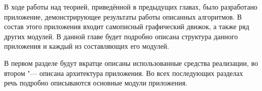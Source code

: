 В ходе работы над теорией, приведённой в предыдущих главах, было разработано приложение, демонстрирующее результаты
работы описанных алгоритмов. В состав этого приложения входит самописный графический движок, а также ряд других модулей.
В данной главе будет подробно описана структура данного приложения и каждый из составляющих его модулей.

В первом разделе будут вкратце описаны использованные средства реализации, во втором "--- описана архитектура
приложения. Во всех последующих разделах речь подробно описываются основные модули приложения.
